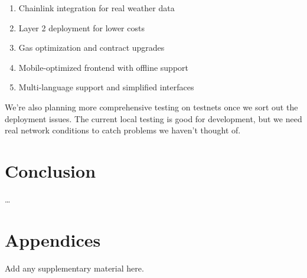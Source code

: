 \documentclass[11pt,a4paper]{article}
\begin{document}
	\begin{enumerate}
		\item Chainlink integration for real weather data
		\item Layer 2 deployment for lower costs
		\item Gas optimization and contract upgrades
		\item Mobile-optimized frontend with offline support
		\item Multi-language support and simplified interfaces
	\end{enumerate}

	We're also planning more comprehensive testing on testnets once we sort out the deployment issues.
	The current local testing is good for development, but we need real network conditions to catch problems we haven't thought of.


	\section{Conclusion}\label{sec:conclusion}
	\ldots

	\printbibliography

	\appendix
	\section*{Appendices}\label{sec:appendix}
	Add any supplementary material here.
\end{document}
